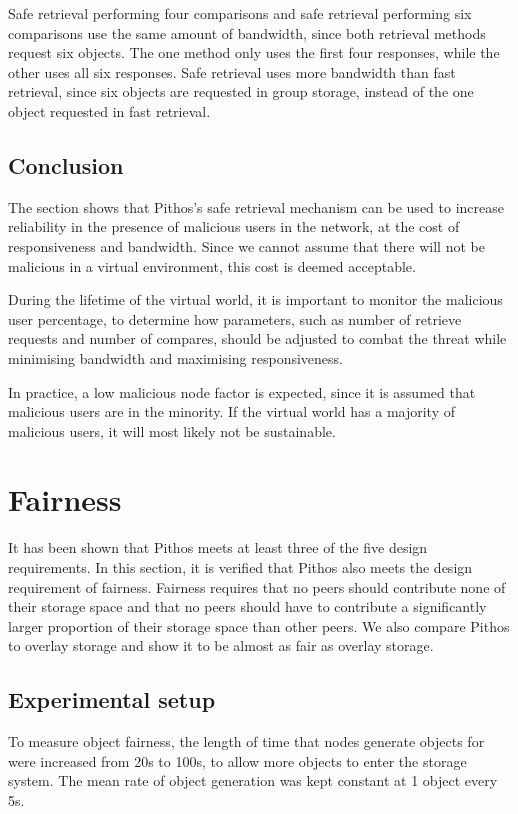 Safe retrieval performing four comparisons and safe retrieval performing six comparisons use the same amount of bandwidth, since both retrieval methods request six objects. The one method only uses the first four responses, while the other uses all six responses. Safe retrieval uses more bandwidth than fast retrieval, since six objects are requested in group storage, instead of the one object requested in fast retrieval.

\subsection{Conclusion}

The section shows that Pithos's safe retrieval mechanism can be used to increase reliability in the presence of malicious users in the network, at the cost of responsiveness and bandwidth. Since we cannot assume that there will not be malicious in a virtual environment, this cost is deemed acceptable.

During the lifetime of the virtual world, it is important to monitor the malicious user percentage, to determine how parameters, such as number of retrieve requests and number of compares, should be adjusted to combat the threat while minimising bandwidth and maximising responsiveness.

In practice, a low malicious node factor is expected, since it is assumed that malicious users are in the minority. If the virtual world has a majority of malicious users, it will most likely not be sustainable.

\section{Fairness}

It has been shown that Pithos meets at least three of the five design requirements. In this section, it is verified that Pithos also meets the design requirement of fairness. Fairness requires that no peers should contribute none of their storage space and that no peers should have to contribute a significantly larger proportion of their storage space than other peers. We also compare Pithos to overlay storage and show it to be almost as fair as overlay storage.

\subsection{Experimental setup}

To measure object fairness, the length of time that nodes generate objects for were increased from 20s to 100s, to allow more objects to enter the storage system. The mean rate of object generation was kept constant at 1 object every 5s.

